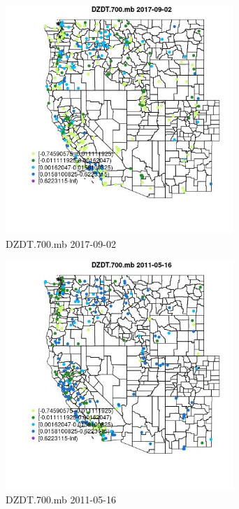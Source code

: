 \begin{figure} 
\centering  
\includegraphics[width=0.77\textwidth]{Code_Outputs/Report_ML_input_PM25_Step4_part_e_de_duplicated_aves_compiled_2019-05-20wNAs_MapObsDZDT700mb2017-09-02.jpg} 
\caption{\label{fig:Report_ML_input_PM25_Step4_part_e_de_duplicated_aves_compiled_2019-05-20wNAsMapObsDZDT700mb2017-09-02}DZDT.700.mb 2017-09-02} 
\end{figure} 
 

\clearpage 

\begin{figure} 
\centering  
\includegraphics[width=0.77\textwidth]{Code_Outputs/Report_ML_input_PM25_Step4_part_e_de_duplicated_aves_compiled_2019-05-20wNAs_MapObsDZDT700mb2011-05-16.jpg} 
\caption{\label{fig:Report_ML_input_PM25_Step4_part_e_de_duplicated_aves_compiled_2019-05-20wNAsMapObsDZDT700mb2011-05-16}DZDT.700.mb 2011-05-16} 
\end{figure} 
 

